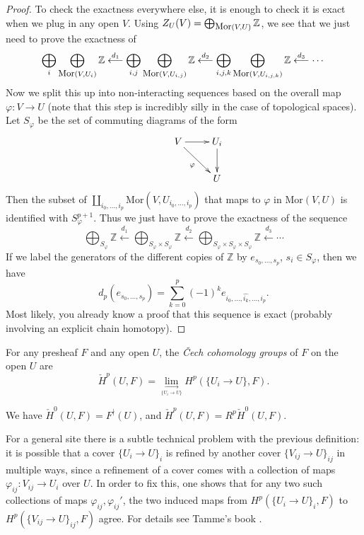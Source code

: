 \begin{proof}
To check the exactness everywhere else, it is enough to check it is exact when we plug in any open $V$. Using $Z_U(V) = \bigoplus_{\mbox{\small Mor}(V,U)} \mathbb{Z}$, we see that we just need to prove the exactness of
\[
\bigoplus_i \bigoplus_{\mbox{\small Mor}(V,U_i)} \mathbb{Z} \stackrel{d_1}{\longleftarrow} \bigoplus_{i,j}\bigoplus_{\mbox{\small Mor}(V,U_{i,j})} \mathbb{Z} \stackrel{d_2}{\longleftarrow} \bigoplus_{i,j,k}\bigoplus_{\mbox{\small Mor}(V,U_{i,j,k})} \mathbb{Z} \stackrel{d_3}{\longleftarrow} \cdots
\]
Now we split this up into non-interacting sequences based on the overall map $\varphi : V\rightarrow U$ (note that this step is incredibly silly in the case of topological spaces). Let $S_\varphi$ be the set of commuting diagrams of the form
\begin{align*}
\xymatrix{&V \ar[r] \ar[dr]_{\varphi} & U_i \ar[d]\\
& & U}
\end{align*}
Then the subset of $\coprod_{i_0, ..., i_p} \mbox{Mor}(V,U_{i_0, ..., i_p})$ that maps to $\varphi$ in $\mbox{Mor}(V,U)$ is identified with $S_\varphi^{p+1}$. Thus we just have to prove the exactness of the sequence
\[
\bigoplus_{S_\varphi} \mathbb{Z} \stackrel{d_1}{\longleftarrow} \bigoplus_{S_\varphi\times S_\varphi} \mathbb{Z} \stackrel{d_2}{\longleftarrow} \bigoplus_{S_\varphi\times S_\varphi\times S_\varphi} \mathbb{Z} \stackrel{d_3}{\longleftarrow} \cdots
\]
If we label the generators of the different copies of $\mathbb{Z}$ by $e_{s_0, ..., s_p}$, $s_i \in S_\varphi$, then we have
\[
d_p(e_{s_0, ..., s_p}) = \sum_{k=0}^p (-1)^k e_{i_0,...,\widehat{i_k}, ...,i_p}.
\]
Most likely, you already know a proof that this sequence is exact (probably involving an explicit chain homotopy).
\end{proof}

\begin{defn} For any presheaf $F$ and any open $U$, the \emph{\v{C}ech cohomology groups} of $F$ on the open $U$ are
\[
\check{H}^p(U,F) = \underset{\underset{\{U_i\rightarrow U\}}{\longrightarrow}}{\lim} H^p(\{U_i\rightarrow U\}, F).
\]
\end{defn}

\begin{rem} We have $\check{H}^0(U,F) = F^\nmid(U)$, and $\check{H}^p(U,F) = R^p\check{H}^0(U,F)$.
\end{rem}

\begin{rem} For a general site there is a subtle technical problem with the previous definition: it is possible that a cover $\{U_i\rightarrow U\}_i$ is refined by another cover $\{V_{ij}\rightarrow U\}_{ij}$ in multiple ways, since a refinement of a cover comes with a collection of maps $\varphi_{ij}:V_{ij}\rightarrow U_i$ over $U$. In order to fix this, one shows that for any two such collections of maps $\varphi_{ij}, \varphi_{ij}'$, the two induced maps from $H^p(\{U_i\rightarrow U\}_i,F)$ to $H^p(\{V_{ij}\rightarrow U\}_{ij},F)$ agree. For details see Tamme's book \cite{etale}.
\end{rem}

